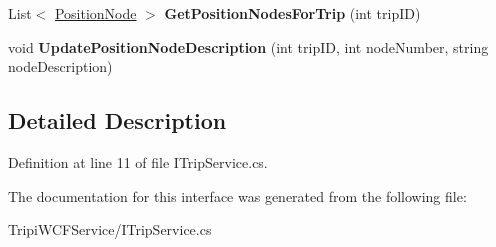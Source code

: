 \begin{DoxyCompactItemize}
\item 
\hypertarget{interface_tripi_w_c_f_1_1_service_1_1_i_trip_service_a907409f375103b8de821cdfeea47fb02}{
List$<$ \hyperlink{class_tripi_w_c_f_1_1_service_1_1_position_node}{PositionNode} $>$ {\bfseries GetPositionNodesForTrip} (int tripID)}
\label{interface_tripi_w_c_f_1_1_service_1_1_i_trip_service_a907409f375103b8de821cdfeea47fb02}

\item 
\hypertarget{interface_tripi_w_c_f_1_1_service_1_1_i_trip_service_a84f87626d1d68286d551af0965839f2c}{
void {\bfseries UpdatePositionNodeDescription} (int tripID, int nodeNumber, string nodeDescription)}
\label{interface_tripi_w_c_f_1_1_service_1_1_i_trip_service_a84f87626d1d68286d551af0965839f2c}

\end{DoxyCompactItemize}


\subsection{Detailed Description}


Definition at line 11 of file ITripService.cs.

The documentation for this interface was generated from the following file:\begin{DoxyCompactItemize}
\item 
TripiWCFService/ITripService.cs\end{DoxyCompactItemize}
